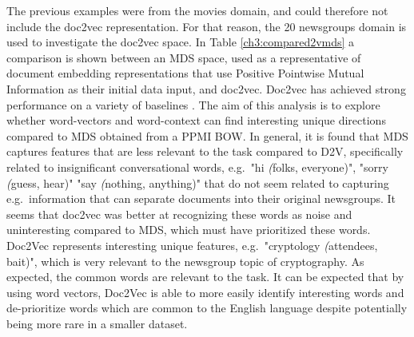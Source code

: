 The previous examples were from the movies domain, and could therefore not  include the doc2vec representation. For that reason, the 20 newsgroups domain is used to investigate the doc2vec space. In Table \ref{ch3:compared2vmds} a comparison is shown between an MDS space, used as a representative of document embedding representations that use Positive Pointwise Mutual Information as their initial data input, and doc2vec. Doc2vec has achieved strong performance on a variety of baselines \cite{Taddy2015}.  The aim of this analysis is to explore whether  word-vectors and word-context can find interesting unique directions compared to MDS obtained from a PPMI BOW. In general, it is found that MDS captures  features that are less relevant to the task compared to D2V, specifically related to insignificant conversational words, e.g.\ "hi \textit({folks, everyone)}", "sorry \textit({guess, hear)}" "say \textit({nothing, anything)}" that do not seem related to capturing e.g.\ information that can separate documents into their original newsgroups. It seems that doc2vec was better at recognizing these words as noise and uninteresting compared to MDS, which must have prioritized these words. Doc2Vec represents interesting unique features, e.g.\ "cryptology \textit({attendees, bait)}", which is very relevant to the  newsgroup topic of cryptography. As expected, the common words are relevant to the task. It can be expected that by using word vectors, Doc2Vec is able to more easily identify interesting words and de-prioritize words which are common to the English language despite potentially being more rare in a smaller dataset.

